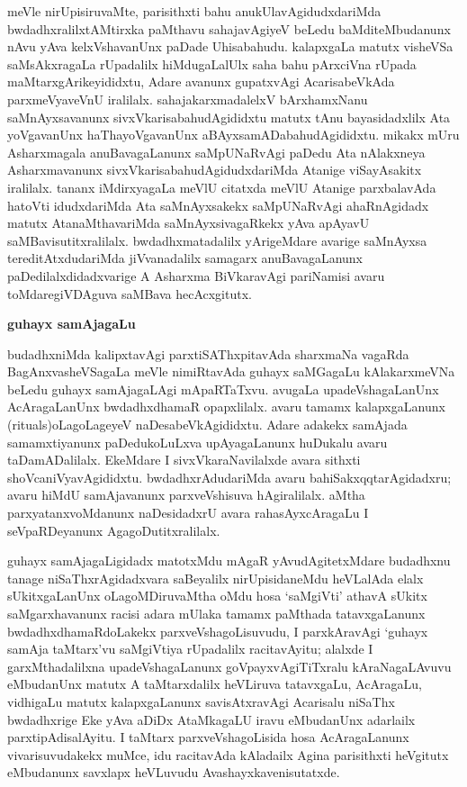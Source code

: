meVle nirUpisiruvaMte, parisithxti bahu anukUlavAgidudxdariMda bwdadhxralilx\break tAMtirxka paMthavu sahajavAgiyeV beLedu baMditeMbudanunx nAvu yAva kelxVshavanUnx paDade Uhisabahudu. kalapxgaLa matutx visheVSa saMsAkxragaLa rUpadalilx hiMdugaLalUlx saha bahu pArxciVna rUpada maMtarxgArikeyididxtu, Adare avanunx gupatxvAgi Acarisa\-beVkAda parxmeVyaveVnU iralilalx. sahajakarxmadalelxV bArxhamxNanu saMnAyxsavanunx sivxVkarisa\-bahudAgididxtu matutx tAnu bayasidadxlilx Ata yoVgavanUnx haThayoVgavanUnx aBAyxsa\break mADabahudAgididxtu. mikakx mUru Asharxmagala anuBavagaLanunx saMpUNaRvAgi \hbox{paDedu} Ata nAlakxneya Asharxmavanunx sivxVkarisabahudAgidudxdariMda Atanige viSayAsakitx iralilalx. tananx iMdirxyagaLa meVlU citatxda meVlU Atanige parxbalavAda hatoVti idudxdariMda Ata saMnAyxsakekx saMpUNaRvAgi ahaRnAgidadx matutx AtanaMthavariMda saMnAyxsivagaRkekx yAva apAyavU saMBavisutitxralilalx. bwdadhxmatadalilx yArigeMdare avarige saMnAyxsa tereditAtxdudariMda jiVvanadalilx samagarx anuBavagaLanunx paDedilalxdidadxvarige A Asharxma BiVkaravAgi pariNamisi avaru toMdaregiVDAguva saMBava hecAcxgitutx.

\bigskip
\begin{center}
{\Large\bf guhayx samAjagaLu}
\end{center}

budadhxniMda kalipxtavAgi parxtiSAThxpitavAda sharxmaNa vagaRda BagAnxvasheVSagaLa meVle nimiRtavAda guhayx saMGagaLu kAlakarxmeVNa beLedu guhayx samAjagaLAgi mApaRTaTxvu. avugaLa upadeVshagaLanUnx AcAragaLanUnx bwdadhxdhamaR opapxlilalx. avaru tamamx kalapxgaLanunx {\rm(rituals)}oLagoLageyeV naDesabeVkAgididxtu. Adare adakekx samAjada samamxtiyanunx paDedukoLuLxva upAyagaLanunx huDukalu avaru taDamADalilalx. EkeMdare I sivxVkaraNavilalxde avara sithxti shoVcaniVyavAgididxtu. bwdadhxrAdudariMda avaru bahiSakxqqtarAgidadxru; avaru hiMdU samAjavanunx parxveVshisuva hAgiralilalx. aMtha parxyatanxvoMdanunx naDesidadxrU avara rahasAyxcAragaLu I seVpaRDeyanunx AgagoDutitxralilalx.

guhayx samAjagaLigidadx matotxMdu mAgaR yAvudAgitetxMdare budadhxnu tanage niSaThxrAgidadxvara saBeyalilx nirUpisidaneMdu heVLalAda elalx sUkitxgaLanUnx oLagoMDiruvaMtha oMdu hosa `saMgiVti' athavA sUkitx saMgarxhavanunx racisi adara mUlaka tamamx paMthada tatavxgaLanunx bwdadhxdhamaRdoLakekx parxveVshagoLisuvudu, I parxkAravAgi `guhayx samAja taMtarx'vu saMgiVtiya rUpadalilx racitavAyitu; alalxde I garxMthadalilxna upadeVshagaLanunx goVpayxvAgiTiTxralu kAraNagaLAvuvu eMbudanUnx matutx A taMtarxdalilx heVLiruva tatavxgaLu, AcAragaLu, vidhigaLu matutx kalapxgaLanunx savisAtxravAgi Acarisalu niSaThx bwdadhxrige Eke yAva aDiDx AtaMkagaLU iravu eMbudanUnx adarlailx parxtipAdisalAyitu. I taMtarx parxveVshagoLisida hosa AcAragaLanunx vivarisuvudakekx muMce, idu racitavAda kAladailx Agina parisithxti heVgitutx eMbudanunx savxlapx heVLuvudu Avashayxkavenisutatxde.


